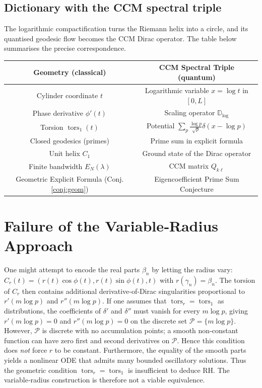 \documentclass[12pt,a4paper]{article}
\newcommand{\tors}{\operatorname{tors}}
\begin{document}
\subsection{Dictionary with the CCM spectral triple}
The logarithmic compactification turns the Riemann helix into a circle, and its quantised geodesic flow becomes the CCM Dirac operator.  The table below summarises the precise correspondence.

\begin{center}
\begin{tabular}{c|c}
\textbf{Geometry (classical)} & \textbf{CCM Spectral Triple (quantum)} \\
\hline
Cylinder coordinate $t$ & Logarithmic variable $x=\log t$ in $[0,L]$ \\
Phase derivative $\phi'(t)$ & Scaling operator $\mathbb{D}_{\log}$ \\
Torsion $\tors_1(t)$ & Potential $\sum_p \frac{\log p}{\sqrt{p}}\delta(x-\log p)$ \\
Closed geodesics (primes) & Prime sum in explicit formula \\
Unit helix $C_1$ & Ground state of the Dirac operator \\
Finite bandwidth $E_N(\lambda)$ & CCM matrix $Q_{k\ell}$ \\
Geometric Explicit Formula (Conj.\ref{conj:geom}) & Eigencoefficient Prime Sum Conjecture
\end{tabular}
\end{center}

\section{Failure of the Variable‑Radius Approach}

One might attempt to encode the real parts $\beta_n$ by letting the radius vary: $C_r(t)=(r(t)\cos\phi(t), r(t)\sin\phi(t), t)$ with $r(\gamma_n)=\beta_n$.  The torsion of $C_r$ then contains additional derivative‑of‑Dirac singularities proportional to $r'(m\log p)$ and $r''(m\log p)$.  If one assumes that $\tors_r = \tors_1$ as distributions, the coefficients of $\delta'$ and $\delta''$ must vanish for every $m\log p$, giving $r'(m\log p)=0$ and $r''(m\log p)=0$ on the discrete set $\mathcal{P}=\{m\log p\}$.  However, $\mathcal{P}$ is discrete with no accumulation points; a smooth non‑constant function can have zero first and second derivatives on $\mathcal{P}$.  Hence this condition does \emph{not} force $r$ to be constant.  Furthermore, the equality of the smooth parts yields a nonlinear ODE that admits many bounded oscillatory solutions.  Thus the geometric condition $\tors_r=\tors_1$ is insufficient to deduce RH.  The variable‑radius construction is therefore not a viable equivalence.
\end{document}
